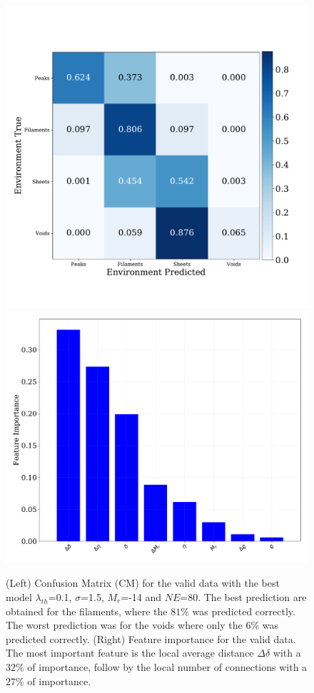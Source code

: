 \documentclass[usenatbib]{mnras}
\begin{document}
\begin{figure}
\centering
    \includegraphics[scale=0.32]{Figs/p_confusion_matrix_valid.pdf}
    \includegraphics[scale=0.28]{Figs/p_features_importance_valid.pdf}  
    \caption{(Left) Confusion Matrix (CM) for the valid data with the best model $\lambda_{th}$=0.1, $\sigma$=1.5, $M_r$=-14 and $NE$=80. The best prediction are obtained for the
      filaments, where the $81\%$ was predicted correctly. The worst  prediction was for the voids where only the $6\%$ was predicted
      correctly.
      (Right) Feature importance for the valid data. The most important feature is the local average distance $\Delta\delta$ with a $32\%$ of importance, follow by the local number of connections with a $27\%$ of importance.} 
    \label{fig:confusion_matrix_valid}
\end{figure}
\end{document}
